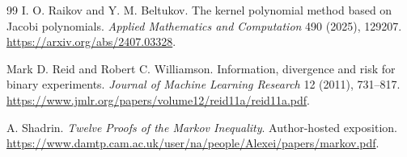 \documentclass[11pt]{article}
\theoremstyle{definition}\newtheorem{definition}[theorem]{Definition}
\theoremstyle{remark}\newtheorem{remark}[theorem]{Remark}
\begin{document}
\begin{thebibliography}{99}
I. O. Raikov and Y. M. Beltukov.
The kernel polynomial method based on Jacobi polynomials.
\emph{Applied Mathematics and Computation} 490 (2025), 129207.
\url{https://arxiv.org/abs/2407.03328}.

Mark D. Reid and Robert C. Williamson.
Information, divergence and risk for binary experiments.
\emph{Journal of Machine Learning Research} 12 (2011), 731--817.
\url{https://www.jmlr.org/papers/volume12/reid11a/reid11a.pdf}.

A. Shadrin.
\emph{Twelve Proofs of the Markov Inequality}.
Author-hosted exposition.
\url{https://www.damtp.cam.ac.uk/user/na/people/Alexei/papers/markov.pdf}.
\end{thebibliography}
\end{document}
